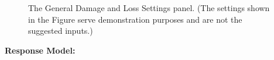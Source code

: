 \begin{figure}[!htbp]
  \caption{The General Damage and Loss Settings panel. (The settings shown in the Figure serve demonstration purposes and are not the suggested inputs.)}
  \label{fig:dl_hazus_general}
\end{figure}

\textbf{Response Model:}


